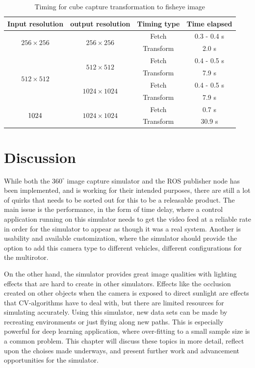 \begin{table}[!htb]
    \centering
    \begin{tabular}{|c|c|c|c|} \hline
        \textbf{Input resolution} & \textbf{output resolution} & \textbf{Timing type} & \textbf{Time elapsed} \\ \hline \hline
        \multirow{2}{*}{$256 \times 256$} & \multirow{2}{*}{$256 \times 256$} & Fetch & 0.3 - 0.4 s\\ \cline{3-4}
         & & Transform & 2.0 s\\ \hline
        \multirow{4}{*}{$512 \times 512$} & \multirow{2}{*}{$512 \times 512$} & Fetch & 0.4 - 0.5 s \\ \cline{3-4}
         & & Transform & 7.9 s\\ \cline{2-4}
         & \multirow{2}{*}{$1024 \times 1024$} & Fetch & 0.4 - 0.5 s\\ \cline{3-4}
         & & Transform & 7.9 s\\ \hline
        \multirow{2}{*}{$1024 \time 1024$} & \multirow{2}{*}{$1024 \times 1024$} & Fetch & 0.7 s\\ \cline{3-4}
         & & Transform & 30.9 s\\ \hline
    \end{tabular}
    \caption{Timing for cube capture transformation to fisheye image}
    \label{tab:res_timing_cube_capture}
\end{table}


\section{Discussion}

While both the $360^\circ$ image capture simulator and the ROS publisher node has been implemented, and is working for their intended purposes, there are still a lot of quirks that needs to be sorted out for this to be a releasable product. The main issue is the performance, in the form of time delay, where a control application running on this simulator needs to get the video feed at a reliable rate in order for the simulator to appear as though it was a real system. Another is usability and available customization, where the simulator should provide the option to add this camera type to different vehicles, different configurations for the multirotor.

On the other hand, the simulator provides great image qualities with lighting effects that are hard to create in other simulators. Effects like the occlusion created on other objects when the camera is exposed to direct sunlight are effects that CV-algorithms have to deal with, but there are limited resources for simulating accurately. Using this simulator, new data sets can be made by recreating environments or just flying along new paths. This is especially powerful for deep learning application, where over-fitting to a small sample size is a common problem. This chapter will discuss these topics in more detail, reflect upon the choises made underways, and present further work and advancement opportunities for the simulator. 

